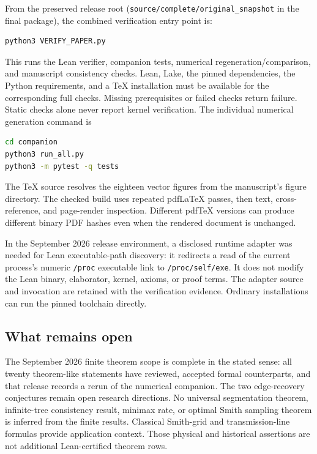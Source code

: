 \documentclass[11pt,letterpaper]{article}
\theoremstyle{plain}
\theoremstyle{plain}
\theoremstyle{plain}
\theoremstyle{definition}
\theoremstyle{definition}
\theoremstyle{definition}
\theoremstyle{definition}
\theoremstyle{remark}
\theoremstyle{remark}
\theoremstyle{remark}
\theoremstyle{remark}
\begin{document}
From the preserved release root (\texttt{source/complete/original\_snapshot} in the final package), the combined verification entry point is:
\begin{lstlisting}[language=bash,numbers=none]
python3 VERIFY_PAPER.py
\end{lstlisting}
This runs the Lean verifier, companion tests, numerical regeneration/comparison, and manuscript consistency checks. Lean, Lake, the pinned dependencies, the Python requirements, and a TeX installation must be available for the corresponding full checks. Missing prerequisites or failed checks return failure. Static checks alone never report kernel verification. The individual numerical generation command is
\begin{lstlisting}[language=bash,numbers=none]
cd companion
python3 run_all.py
python3 -m pytest -q tests
\end{lstlisting}
The TeX source resolves the eighteen vector figures from the manuscript's figure directory. The checked build uses repeated pdfLaTeX passes, then text, cross-reference, and page-render inspection. Different pdfTeX versions can produce different binary PDF hashes even when the rendered document is unchanged.

In the September 2026 release environment, a disclosed runtime adapter was needed for Lean executable-path discovery: it redirects a read of the current process's numeric \texttt{/proc} executable link to \texttt{/proc/self/exe}. It does not modify the Lean binary, elaborator, kernel, axioms, or proof terms. The adapter source and invocation are retained with the verification evidence. Ordinary installations can run the pinned toolchain directly.

\subsection{What remains open}

The September 2026 finite theorem scope is complete in the stated sense: all twenty theorem-like statements have reviewed, accepted formal counterparts, and that release records a rerun of the numerical companion. The two edge-recovery conjectures remain open research directions. No universal segmentation theorem, infinite-tree consistency result, minimax rate, or optimal Smith sampling theorem is inferred from the finite results. Classical Smith-grid and transmission-line formulas provide application context. Those physical and historical assertions are not additional Lean-certified theorem rows.
\end{document}
